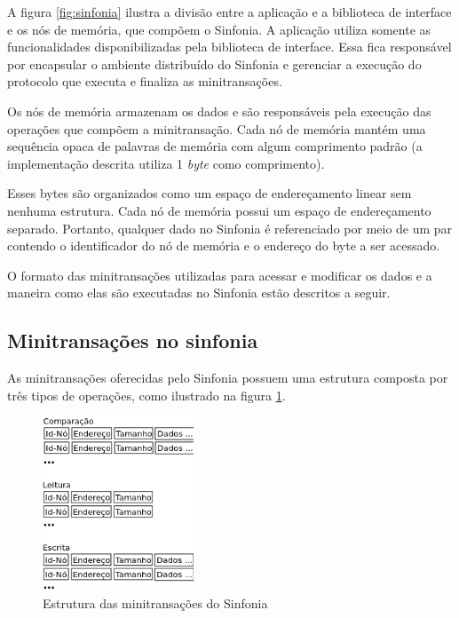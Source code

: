 \documentclass[11pt,twoside,a4paper]{book}
\begin{document}
A figura \ref{fig:sinfonia} ilustra a divisão entre a aplicação e a biblioteca de interface e os nós de memória, que compõem o Sinfonia. A aplicação utiliza somente as funcionalidades disponibilizadas pela biblioteca de interface. Essa fica responsável por encapsular o ambiente distribuído do Sinfonia e gerenciar a execução do protocolo que executa e finaliza as minitransações.

Os nós de memória armazenam os dados e são responsáveis pela execução das operações que compõem a minitransação. Cada nó de memória mantém uma sequência opaca de palavras de memória com algum comprimento padrão (a implementação descrita utiliza 1 \emph{byte} como comprimento). 

Esses bytes são organizados como um espaço de endereçamento linear sem nenhuma estrutura. Cada nó de memória possui um espaço de endereçamento separado. Portanto, qualquer dado no Sinfonia é referenciado por meio de um par contendo o identificador do nó de memória e o endereço do byte a ser acessado.

O formato das minitransações utilizadas para acessar e modificar os dados e a maneira como elas são executadas no Sinfonia estão descritos a seguir.

\subsection{Minitransações no sinfonia}
\label{subsec:minitransacoes_sinfonia}
As minitransações oferecidas pelo Sinfonia possuem uma estrutura composta por três tipos de operações, como ilustrado na figura \ref{fig:minitransacao_sinfonia}.

\begin{figure}
  \centering
  \includegraphics[width=0.4\textwidth]{minitransacao_sinfonia} 
  \caption{Estrutura das minitransações do Sinfonia}
  \label{fig:minitransacao_sinfonia} 
\end{figure}
\end{document}
